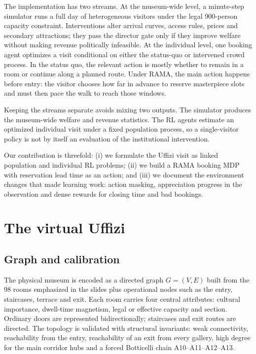 \documentclass[11pt]{article}
\newcommand{\added}[1]{{\color{green!50!black}#1}}
\begin{document}
\added{The implementation has two streams.} At the museum-wide level, a minute-step simulator runs a
full day of heterogeneous visitors under the legal 900-person capacity constraint. Interventions alter
arrival curves, access rules, prices and secondary attractions; \added{they pass the director gate only if
they improve welfare without making revenue politically infeasible.} At the individual level, one
\added{booking agent} optimizes a visit conditional on either the status-quo or intervened crowd process. In
the status quo, the relevant action is mostly whether to remain in a room or continue along a planned
route. Under RAMA, the main action happens before entry: the visitor chooses how far in advance
to reserve masterpiece slots and must then pace the walk to reach those windows.

Keeping the streams separate avoids mixing two outputs. The simulator produces the museum-wide
welfare and revenue statistics. The RL agents estimate an optimized individual visit under a fixed
population process, so a single-visitor policy is not by itself an evaluation of the institutional
intervention.

\added{Our contribution is threefold: (i) we formulate the Uffizi visit as linked population and
individual RL problems; (ii) we build a RAMA booking MDP with reservation lead time as an action; and
(iii) we document the environment changes that made learning work: action masking, appreciation
progress in the observation and dense rewards for closing time and bad bookings.}

\section{The virtual Uffizi}

\subsection{Graph and calibration}

The physical museum is encoded as a directed graph $G=(V,E)$ built from the 98 rooms emphasized in the
slides plus operational nodes such as the entry, staircases, terrace and exit. Each room carries four
central attributes: cultural importance, dwell-time magnetism, legal or effective capacity and
section. Ordinary doors are represented bidirectionally; staircases and exit routes are directed. The topology is validated with structural invariants:
weak connectivity, reachability from the entry, reachability of an exit from every gallery, high
degree for the main corridor hubs and a forced Botticelli chain A10--A11--A12--A13.
\end{document}
